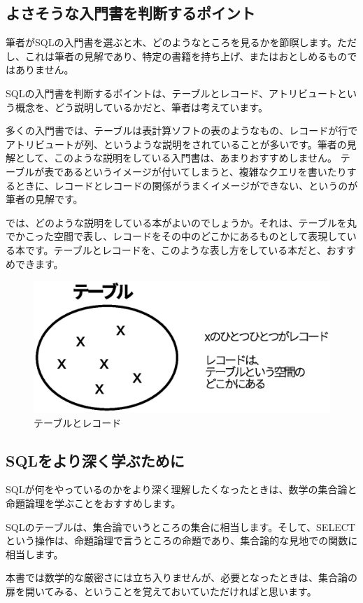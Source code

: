 \subsection{よさそうな入門書を判断するポイント}

筆者がSQLの入門書を選ぶと木、どのようなところを見るかを節瞑します。ただし、これは筆者の見解であり、特定の書籍を持ち上げ、またはおとしめるものではありません。

SQLの入門書を判断するポイントは、テーブルとレコード、アトリビュートという概念を、どう説明しているかだと、筆者は考えています。

多くの入門書では、テーブルは表計算ソフトの表のようなもの、レコードが行でアトリビュートが列、というような説明をされていることが多いです。筆者の見解として、このような説明をしている入門書は、あまりおすすめしません。
テーブルが表であるというイメージが付いてしまうと、複雑なクエリを書いたりするときに、レコードとレコードの関係がうまくイメージができない、というのが筆者の見解です。

では、どのような説明をしている本がよいのでしょうか。それは、テーブルを丸でかこった空間で表し、レコードをその中のどこかにあるものとして表現している本です。テーブルとレコードを、このような表し方をしている本だと、おすすめできます。

\begin{figure}[htbp]
	\includegraphics[width=12cm,clip]{draw/table.eps}
	\caption{テーブルとレコード}
	\label{fig:animals_kinds_er}
\end{figure}



\subsection{SQLをより深く学ぶために}

SQLが何をやっているのかをより深く理解したくなったときは、数学の集合論と命題論理を学ぶことをおすすめします。

SQLのテーブルは、集合論でいうところの集合に相当します。そして、SELECTという操作は、命題論理で言うところの命題であり、集合論的な見地での関数に相当します。

本書では数学的な厳密さには立ち入りませんが、必要となったときは、集合論の扉を開いてみる、ということを覚えておいていただければと思います。

